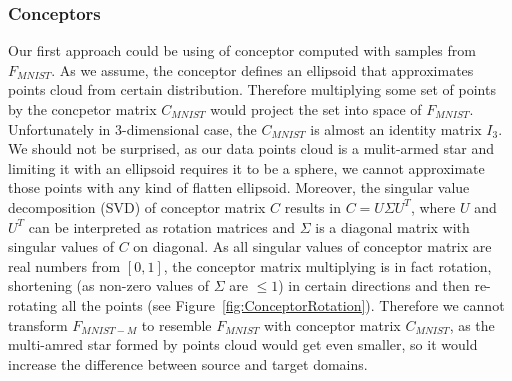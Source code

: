\documentclass{article}
\begin{document}
\subsubsection{Conceptors}
\par
Our first approach could be using of conceptor computed with samples from $F_{MNIST}$. As we assume, the conceptor defines an ellipsoid that approximates points cloud from certain distribution. Therefore multiplying some set of points by the concpetor matrix $C_{MNIST}$ would project the set into space of $F_{MNIST}$. Unfortunately in 3-dimensional case, the $C_{MNIST}$ is almost an identity matrix $I_{3}$. We should not be surprised, as our data points cloud is a mulit-armed star and limiting it with an ellipsoid requires it to be a sphere, we cannot approximate those points with any kind of flatten ellipsoid. Moreover, the singular value decomposition (SVD) of conceptor matrix $C$ results in $C = U\Sigma U^{T}$, where $U$ and $U^{T}$ can be interpreted as rotation matrices and $\Sigma$ is a diagonal matrix with singular values of $C$ on diagonal. As all singular values of conceptor matrix are real numbers from $[0,1]$, the conceptor matrix multiplying is in fact rotation, shortening (as non-zero values of $\Sigma$ are $\leq 1$) in certain directions and then re-rotating all the points (see Figure~\ref{fig:ConceptorRotation}). Therefore we cannot transform $F_{MNIST-M}$ to resemble $F_{MNIST}$ with conceptor matrix $C_{MNIST}$, as the multi-amred star formed by points cloud would get even smaller, so it would increase the difference between source and target domains.
\end{document}

